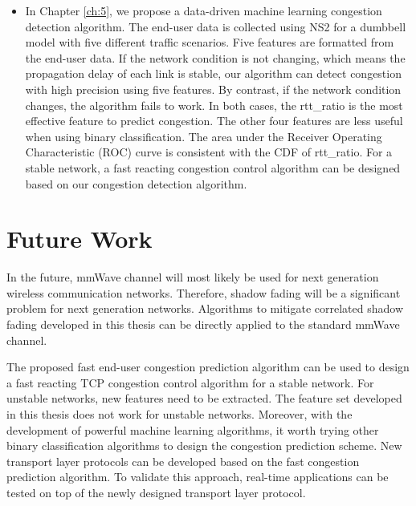 \begin{itemize}
 \item In Chapter \ref{ch:5}, we propose a data-driven machine learning congestion detection algorithm. The end-user data is collected using NS2 for a dumbbell model with five different traffic scenarios. Five features are formatted from the end-user data. If the network condition is not changing, which means the propagation delay of each link is stable, our algorithm can detect congestion with high precision using five features. By contrast, if the network condition changes, the algorithm fails to work. In both cases, the rtt\_ratio is the most effective feature to predict congestion. The other four features are less useful when using binary classification. The area under the Receiver Operating Characteristic (ROC) curve is consistent with the CDF of rtt\_ratio. For a stable network, a fast reacting congestion control algorithm can be designed based on our congestion detection algorithm.

 \end{itemize}
 \section{Future Work}
 \par In the future, mmWave channel will most likely be used for next generation wireless communication networks. Therefore, shadow fading will be a significant problem for next generation networks. Algorithms to mitigate correlated shadow fading developed in this thesis can be directly applied to the standard mmWave channel. 
 \par The proposed fast end-user congestion prediction algorithm can be used to design a fast reacting TCP congestion control algorithm for a stable network. For unstable networks, new features need to be extracted. The feature set developed in this thesis does not work for unstable networks. Moreover, with the development of powerful machine learning algorithms, it worth trying other binary classification algorithms to design the congestion prediction scheme. New transport layer protocols can be developed based on the fast congestion prediction algorithm. To validate this approach, real-time applications can be tested on top of the newly designed transport layer protocol.